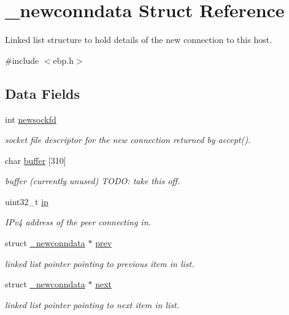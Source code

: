 \hypertarget{struct__newconndata}{\section{\-\_\-newconndata \-Struct \-Reference}
\label{struct__newconndata}
}


\-Linked list structure to hold details of the new connection to this host.  




{\ttfamily \#include $<$ebp.\-h$>$}

\subsection*{\-Data \-Fields}
\begin{DoxyCompactItemize}
\item 
int \hyperlink{struct__newconndata_aefdd831ed1cd73e50f980063361576ba}{newsockfd}
\begin{DoxyCompactList}\small\item\em socket file descriptor for the new connection returned by accept(). \end{DoxyCompactList}\item 
char \hyperlink{struct__newconndata_a0f29c4c04d503e5e385795a66dfe6890}{buffer} \mbox{[}310\mbox{]}
\begin{DoxyCompactList}\small\item\em buffer (currently unused) \-T\-O\-D\-O\-: take this off. \end{DoxyCompactList}\item 
uint32\-\_\-t \hyperlink{struct__newconndata_a69ddb9c845da426f636d9dd0dbed4e7e}{ip}
\begin{DoxyCompactList}\small\item\em \-I\-Pv4 address of the peer connecting in. \end{DoxyCompactList}\item 
struct \hyperlink{struct__newconndata}{\-\_\-newconndata} $\ast$ \hyperlink{struct__newconndata_aeec1dced4bad04f81af5d652efe01922}{prev}
\begin{DoxyCompactList}\small\item\em linked list pointer pointing to previous item in list. \end{DoxyCompactList}\item 
struct \hyperlink{struct__newconndata}{\-\_\-newconndata} $\ast$ \hyperlink{struct__newconndata_a0fb3e0f3ffb0464599792063a7b86388}{next}
\begin{DoxyCompactList}\small\item\em linked list pointer pointing to next item in list. \end{DoxyCompactList}\end{DoxyCompactItemize}


